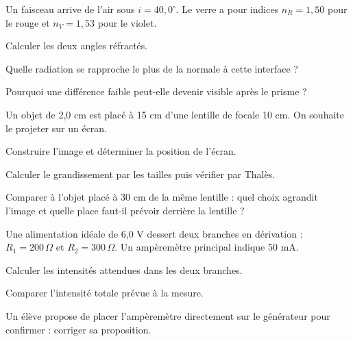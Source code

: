 \label{defi-ex-17-1}
Un faisceau arrive de l’air sous $i=40,0^\circ$. Le verre a pour indices $n_R=1,50$ pour le rouge et $n_V=1,53$ pour le violet.
\begin{questions}
\item Calculer les deux angles réfractés.
\item Quelle radiation se rapproche le plus de la normale à cette interface ?
\item Pourquoi une différence faible peut-elle devenir visible après le prisme ?
\end{questions}
\smallskip{}\hfill{}

\label{defi-ex-18-1}
Un objet de 2,0 cm est placé à 15 cm d’une lentille de focale 10 cm. On souhaite le projeter sur un écran.
\begin{questions}
\item Construire l’image et déterminer la position de l’écran.
\item Calculer le grandissement par les tailles puis vérifier par Thalès.
\item Comparer à l’objet placé à 30 cm de la même lentille : quel choix agrandit l’image et quelle place faut-il prévoir derrière la lentille ?
\end{questions}
\smallskip{}\hfill{}

\label{defi-ex-19-1}
Une alimentation idéale de 6,0 V dessert deux branches en dérivation : $R_1=200\,\Omega$ et $R_2=300\,\Omega$. Un ampèremètre principal indique 50 mA.
\begin{questions}
\item Calculer les intensités attendues dans les deux branches.
\item Comparer l’intensité totale prévue à la mesure.
\item Un élève propose de placer l’ampèremètre directement sur le générateur pour confirmer : corriger sa proposition.
\end{questions}
\smallskip{}\hfill{}


